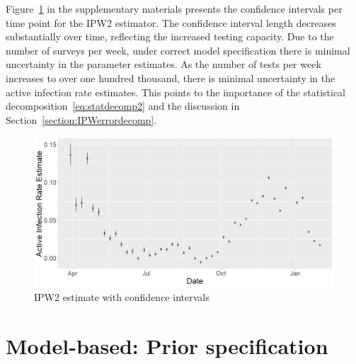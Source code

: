 \documentclass[11pt]{amsart}
\numberwithin{equation}{section}
\theoremstyle{plain}
\begin{document}
Figure~\ref{fig:air_cis} in the supplementary materials presents the confidence intervals per time point for the IPW2 estimator.  The confidence interval length decreases substantially over time, reflecting the increased testing capacity.  Due to the number of surveys per week, under correct model specification there is minimal uncertainty in the parameter estimates.  As the number of tests per week increases to over one hundred thousand, there is minimal uncertainty in the active infection rate estimates. This points to the importance of the statistical decomposition~\eqref{eq:statdecomp2} and the discussion in Section~\ref{section:IPWerrordecomp}.

\begin{figure}[!th]
 \centering
 \includegraphics[width=.9\linewidth]{../figs/tv_air_cis.png}
 \caption{IPW2 estimate with confidence intervals}
 \label{fig:air_cis}
\end{figure}



\section{Model-based: Prior specification}
\label{app:prior_modelbased}
\end{document}
